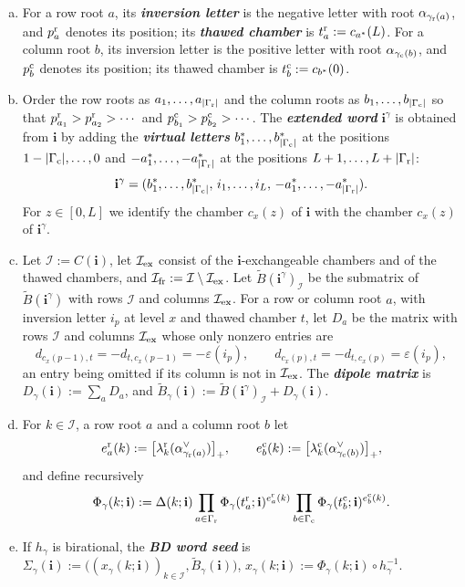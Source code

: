 \documentclass[a4paper]{amsart}
\numberwithin{equation}{section}
\theoremstyle{definition}
\theoremstyle{remark}
\newcommand{\mcI}{\mathcal{I}}
\newcommand{\bfi}{\mathbf{i}}
\newcommand{\tB}{\widetilde{B}}
\newcommand{\rr}{{\rm r}}
\newcommand{\cc}{{\rm c}}
\newcommand{\ex}{{\rm ex}}
\newcommand{\fr}{{\rm fr}}
\newcommand{\newword}[1]{\textbf{\emph{#1}}}
\begin{document}
\begin{definition}
  \label{def: model}
  \begin{enumerate}[(a)]
    \item For a row root $a$, its \newword{inversion letter} is the negative letter with root $\alpha_{\gamma_{\rr}(a)}$, and $p^\rr_a$ denotes its position; its \newword{thawed chamber} is $t^\rr_a:=c_{a^*}(L)$.
    For a column root $b$, its inversion letter is the positive letter with root $\alpha_{\gamma_{\cc}(b)}$, and $p^\cc_b$ denotes its position; its thawed chamber is $t^\cc_b:=c_{b^*}(0)$.
    \item Order the row roots as $a_1,\dots,a_{|\Gamma_{\rr}|}$ and the column roots as $b_1,\dots,b_{|\Gamma_{\cc}|}$ so that $p^\rr_{a_1}>p^\rr_{a_2}>\cdots$ and $p^\cc_{b_1}>p^\cc_{b_2}>\cdots$.
    The \newword{extended word} $\bfi^\gamma$ is obtained from $\bfi$ by adding the \newword{virtual letters} $b_1^*,\dots,b_{|\Gamma_{\cc}|}^*$ at the positions $1-|\Gamma_{\cc}|,\dots,0$ and $-a_1^*,\dots,-a_{|\Gamma_{\rr}|}^*$ at the positions $L+1,\dots,L+|\Gamma_{\rr}|$:
    \[
      \bfi^\gamma=(b_1^*,\dots,b_{|\Gamma_{\cc}|}^*,\,i_1,\dots,i_L,\,-a_1^*,\dots,-a_{|\Gamma_{\rr}|}^*).
    \]
    For $z\in[0,L]$ we identify the chamber $c_x(z)$ of $\bfi$ with the chamber $c_x(z)$ of $\bfi^\gamma$.
    \item Let $\mcI:=C(\bfi)$, let $\mcI_\ex$ consist of the $\bfi$-exchangeable chambers and of the thawed chambers, and $\mcI_\fr:=\mcI\setminus\mcI_\ex$.
    Let $\tB(\bfi^\gamma)_\mcI$ be the submatrix of $\tB(\bfi^\gamma)$ with rows $\mcI$ and columns $\mcI_\ex$.
    For a row or column root $a$, with inversion letter $i_p$ at level $x$ and thawed chamber $t$, let $D_a$ be the matrix with rows $\mcI$ and columns $\mcI_\ex$ whose only nonzero entries are
    \[
      d_{c_x(p-1),t}=-d_{t,c_x(p-1)}=-\varepsilon(i_p),
      \qquad
      d_{c_x(p),t}=-d_{t,c_x(p)}=\varepsilon(i_p),
    \]
    an entry being omitted if its column is not in $\mcI_\ex$.
    The \newword{dipole matrix} is $D_\gamma(\bfi):=\sum_aD_a$, and $\tB_\gamma(\bfi):=\tB(\bfi^\gamma)_\mcI+D_\gamma(\bfi)$.
    \item For $k\in\mcI$, a row root $a$ and a column root $b$ let
    \[
      e^\rr_a(k):=\big[\lambda^\rr_k(\alpha^\vee_{\gamma_{\rr}(a)})\big]_+,
      \qquad
      e^\cc_b(k):=\big[\lambda^\cc_k(\alpha^\vee_{\gamma_{\cc}(b)})\big]_+,
    \]
    and define recursively
    \begin{equation}
      \label{eq: Phi}
      \Phi_\gamma(k;\bfi):=\Delta(k;\bfi)\prod_{a\in\Gamma_{\rr}}\Phi_\gamma(t^\rr_a;\bfi)^{e^\rr_a(k)}\prod_{b\in\Gamma_{\cc}}\Phi_\gamma(t^\cc_b;\bfi)^{e^\cc_b(k)}.
    \end{equation}
    \item If $h_\gamma$ is birational, the \newword{BD word seed} is $\Sigma_\gamma(\bfi):=\big((x_\gamma(k;\bfi))_{k\in\mcI},\tB_\gamma(\bfi)\big)$, $x_\gamma(k;\bfi):=\Phi_\gamma(k;\bfi)\circ h_\gamma^{-1}$.
  \end{enumerate}
\end{definition}
\end{document}
